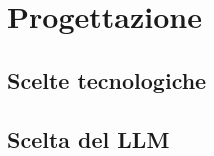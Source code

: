 \pagebreak
\section{Progettazione}
\label{sez:progettazione}
 


\subsection{Scelte tecnologiche}
\label{subsec:scelte-tecnologiche}


\subsection{Scelta del LLM}
\label{subsec:scelta-llm}

